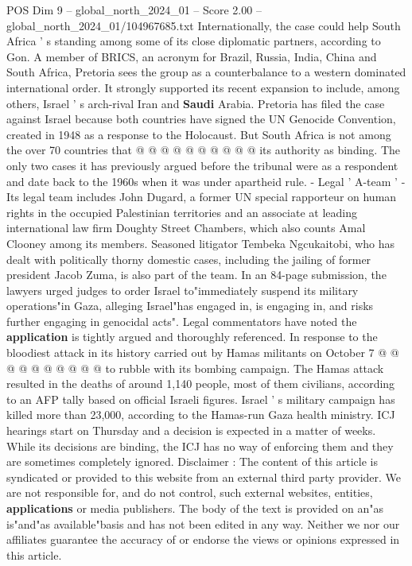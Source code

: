\begin{textsample}{POS Dim 9 – global\_north\_2024\_01 – Score 2.00 – global\_north\_2024\_01/104967685.txt}
Internationally, the case could help South Africa ' s standing among some of its close diplomatic partners, according to Gon.
A member of BRICS, an acronym for Brazil, Russia, India, China and South Africa, Pretoria sees the group as a counterbalance to a western dominated international order.
It strongly supported its recent expansion to include, among others, Israel ' s arch-rival Iran and \textbf{Saudi} Arabia.
Pretoria has filed the case against Israel because both countries have signed the UN Genocide Convention, created in 1948 as a response to the Holocaust.
But South Africa is not among the over 70 countries that @ @ @ @ @ @ @ @ @ @ its authority as binding.
The only two cases it has previously argued before the tribunal were as a respondent and date back to the 1960s when it was under apartheid rule. - Legal ' A-team ' - Its legal team includes John Dugard, a former UN special rapporteur on human rights in the occupied Palestinian territories and an associate at leading international law firm Doughty Street Chambers, which also counts Amal Clooney among its members.
Seasoned litigator Tembeka Ngcukaitobi, who has dealt with politically thorny domestic cases, including the jailing of former president Jacob Zuma, is also part of the team.
In an 84-page submission, the lawyers urged judges to order Israel to"immediately suspend its military operations"in Gaza, alleging Israel"has engaged in, is engaging in, and risks further engaging in genocidal acts".
Legal commentators have noted the \textbf{application} is tightly argued and thoroughly referenced.
In response to the bloodiest attack in its history carried out by Hamas militants on October 7 @ @ @ @ @ @ @ @ @ @ to rubble with its bombing campaign.
The Hamas attack resulted in the deaths of around 1,140 people, most of them civilians, according to an AFP tally based on official Israeli figures.
Israel ' s military campaign has killed more than 23,000, according to the Hamas-run Gaza health ministry.
ICJ hearings start on Thursday and a decision is expected in a matter of weeks.
While its decisions are binding, the ICJ has no way of enforcing them and they are sometimes completely ignored.
Disclaimer : The content of this article is syndicated or provided to this website from an external third party provider.
We are not responsible for, and do not control, such external websites, entities, \textbf{applications} or media publishers.
The body of the text is provided on an"as is"and"as available"basis and has not been edited in any way.
Neither we nor our affiliates guarantee the accuracy of or endorse the views or opinions expressed in this article.

\end{textsample}

